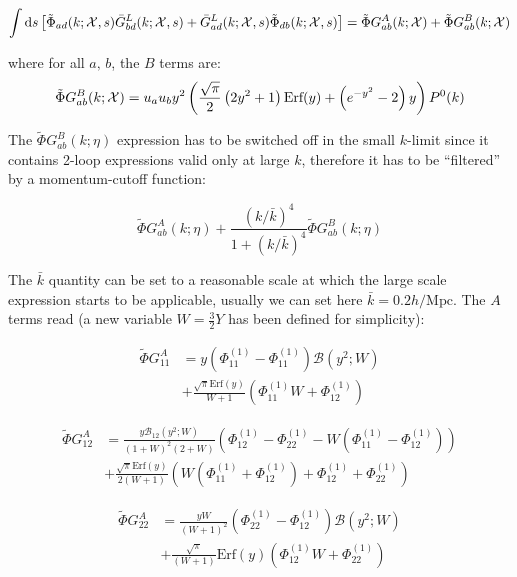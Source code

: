 \begin{equation}
\int\mathrm{d} s\left[\tilde{\Phi}_{ad}(k;\mathcal{X},s)\bar{G}_{bd}^{L}(k;\mathcal{X},s)+\bar{G}_{ad}^{L}(k;\mathcal{X},s)\tilde{\Phi}_{db}(k;\mathcal{X},s)\right]=\tilde{\Phi}G_{ab}^{A}(k;\mathcal{X})+\tilde{\Phi}G_{ab}^{B}(k;\mathcal{X})
\end{equation}


where for all $a,\, b$, the $B$ terms are: 
\begin{equation}
\tilde{\Phi}G_{ab}^{B}(k;\mathcal{X})=u_{a}u_{b}y^{2}\left(\frac{\sqrt{\pi}}{2}\left(2y^{2}+1\right)\text{Erf}(y)+\left(e^{-y^{2}}-2\right)y\right)P^{0}(k)
\end{equation}


The $\tilde{\Phi}G_{ab}^{B}(k;\eta)$ expression has to be switched
off in the small $k$-limit since it contains 2-loop expressions valid
only at large $k$, therefore it has to be ``filtered'' by a momentum-cutoff
function:

\[
\tilde{\Phi}G_{ab}^{A}(k;\eta)+\frac{(k/\bar{k})^{4}}{1+(k/\bar{k})^{4}}\tilde{\Phi}G_{ab}^{B}(k;\eta)
\]


The $\bar{k}$ quantity can be set to a reasonable scale at which
the large scale expression starts to be applicable, usually we can
set here $\bar{k}=0.2h/\mbox{Mpc}$.
The $A$ terms read (a new variable $W=\frac{3}{2}Y$ has been defined
for simplicity):

\begin{align}
\tilde{\Phi}G_{11}^{A} & =y(\Phi_{11}^{(1)}-\Phi_{11}^{(1)})\mathcal{B}(y^{2};W)\\
 & +\frac{\sqrt{\pi}\text{Erf}(y)}{W+1}(\Phi_{11}^{(1)}W+\Phi_{12}^{(1)})\nonumber 
\end{align}


\begin{align}
\tilde{\Phi}G_{12}^{A} & =\frac{y\mathcal{\mathcal{B}}_{12}(y^{2};W)}{(1+W)^{2}(2+W)}(\Phi_{12}^{(1)}-\Phi_{22}^{(1)}-W(\Phi_{11}^{(1)}-\Phi_{12}^{(1)}))\\
 & +\frac{\sqrt{\pi}\text{Erf}(y)}{2(W+1)}(W(\Phi_{11}^{(1)}+\Phi_{12}^{(1)})+\Phi_{12}^{(1)}+\Phi_{22}^{(1)})
\end{align}


\begin{align}
\tilde{\Phi}G_{22}^{A} & =\frac{yW}{(W+1)^{2}}(\Phi_{22}^{(1)}-\Phi_{12}^{(1)})\mathcal{B}(y^{2};W)\\
 & +\frac{\sqrt{\pi}}{(W+1)}\text{Erf}(y)(\Phi_{12}^{(1)}W+\Phi_{22}^{(1)})\nonumber 
\end{align}


